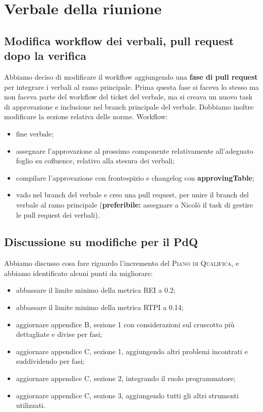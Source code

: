 \section{Verbale della riunione}

\subsection{Modifica workflow dei verbali, pull request dopo la verifica}
Abbiamo deciso di modificare il workflow aggiungendo una \textbf{fase di pull request} per integrare i verbali al ramo principale.
Prima questa fase si faceva lo stesso ma non faceva parte del workflow del ticket del verbale, ma si creava un nuovo task di approvazione e inclusione nel branch principale del verbale.
Dobbiamo inoltre modificare la sezione relativa delle norme.
Workflow:
\begin{itemize}
	\item fine verbale;
	\item assegnare l'approvazione al prossimo componente relativamente all'adeguato foglio su cofluence, relativo alla stesura dei verbali;
	\item compilare l'approvazione con  frontespizio e changelog con \textbf{approvingTable};
	\item vado nel branch del verbale e creo una pull request, per unire il branch del verbale al ramo principale (\textbf{preferibile:} assegnare a Nicolò il task di gestire le pull request dei verbali).
	
\end{itemize}
\subsection{Discussione su modifiche per il PdQ}
Abbiamo discusso cosa fare riguardo l'incremento del \textsc{Piano di Qualifica}, e abbiamo identificato alcuni punti da migliorare:
\begin{itemize}
	\item abbassare il limite minimo della metrica REI a 0.2;
	\item abbassare il limite minimo della metrica RTPI a 0.14;
	\item aggiornare appendice B, sezione 1 con considerazioni sul cruscotto più dettagliate e divise per fasi;
	\item aggiornare appendice C, sezione 1, aggiungendo altri problemi incontrati e suddividendo per fasi;
	\item aggiornare appendice C, sezione 2, integrando il ruolo programmatore;
	\item aggiornare appendice C, sezione 3, aggiungendo tutti gli altri strumenti utilizzati.
\end{itemize}

